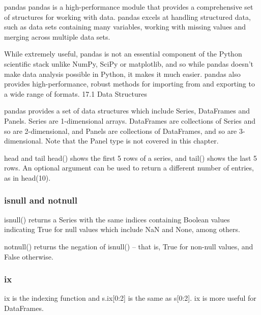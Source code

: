 \documentclass[KSmain.tex]{subfiles}
\begin{document}
 

pandas
pandas is a high-performance module that provides a comprehensive set of structures for working with
data. pandas excels at handling structured data, such as data sets containing many variables, working with
missing values and merging across multiple data sets. 

While extremely useful, pandas is not an essential component of the Python scientific stack unlike NumPy, SciPy or matplotlib, and so while pandas doesn’t
make data analysis possible in Python, it makes it much easier. pandas also provides high-performance,
robust methods for importing from and exporting to a wide range of formats.
17.1 Data Structures

pandas provides a set of data structures which include Series, DataFrames and Panels. Series are 1-dimensional
arrays. DataFrames are collections of Series and so are 2-dimensional, and Panels are collections of DataFrames,
and so are 3-dimensional. Note that the Panel type is not covered in this chapter.

head and tail
head() shows the first 5 rows of a series, and tail() shows the last 5 rows. An optional argument can be
used to return a different number of entries, as in head(10).
\subsubsection{isnull and notnull}

isnull() returns a Series with the same indices containing Boolean values indicating True for null values
which include NaN and None, among others. 

notnull() returns the negation of isnull() – that is, True for
non-null values, and False otherwise.
\subsubsection{ix}
ix is the indexing function and s.ix[0:2] is the same as s[0:2]. ix is more useful for DataFrames.

\end{document}
